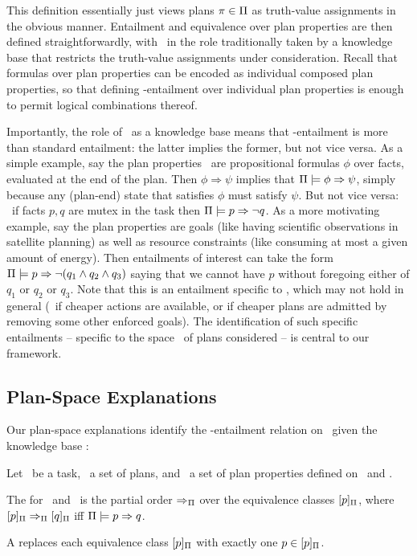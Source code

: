This definition essentially just views plans $\pi \in \Pi$ as
truth-value assignments in the obvious manner. Entailment and
equivalence over plan properties are then defined straightforwardly,
with \plans\ in the role traditionally taken by a knowledge base that
restricts the truth-value assignments under consideration. Recall that
formulas over plan properties can be encoded as individual composed
plan properties, so that defining \plans-entailment over individual plan
properties is enough to permit logical combinations thereof.

Importantly, the role of \plans\ as a knowledge base means that
\plans-entailment is more than standard entailment: the latter implies
the former, but not vice versa. As a simple example, say the plan
properties \props\ are propositional formulas $\phi$ over facts,
evaluated at the end of the plan. Then $\phi \Rightarrow \psi$ implies
that $\Pi \models \phi \Rightarrow \psi$, simply because any (plan-end)
state that satisfies $\phi$ must satisfy $\psi$. But not vice versa:
\eg\ if facts $p, q$ are mutex in the task then
$\Pi \models p \Rightarrow \neg q$. As a more motivating example, say the
plan properties are goals (like having scientific observations in
satellite planning) as well as resource constraints (like consuming at
most a given amount of energy). Then entailments of interest can take
the form $\Pi \models p \Rightarrow \neg (q_1 \wedge q_2 \wedge q_3)$
saying that we cannot have $p$ without foregoing either of $q_1$ or
$q_2$ or $q_3$. Note that this is an entailment specific to \plans,
which may not hold in general (\eg\ if cheaper actions are available,
or if cheaper plans are admitted by removing some other enforced
goals). The identification of such specific entailments -- specific to
the space \plans\ of plans considered -- is central to our framework.





\subsection{Plan-Space Explanations}

Our plan-space explanations identify the \plans-entailment relation on
\props\ given the knowledge base \plans:

\begin{definition}
Let \task\ be a task, \plans\ a set of plans, and \props\ a set of
plan properties defined on \task\ and \plans.

The  for \plans\ and
\props\ is the partial order $\Rightarrow_{\Pi}$ over the equivalence
classes $[p]_{\Pi}$, where $[p]_{\Pi}
\Rightarrow_{\Pi} [q]_{\Pi}$ iff
$\Pi \models p \Rightarrow q$.

A  replaces each equivalence class
$[p]_{\Pi}$ with exactly one $p \in
[p]_{\Pi}$.
\end{definition}

